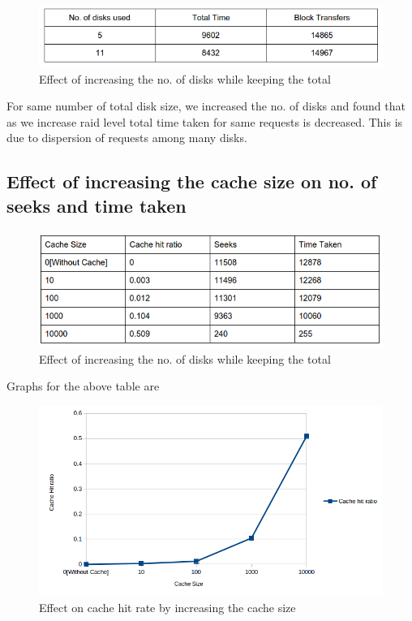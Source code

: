 \documentclass[11pt]{article}
\begin{document}
\begin{figure}[ht!]
\center
\includegraphics[scale = 0.60]{images/table3.png}
\caption{Effect of increasing the no. of disks while keeping the total }
\label{overflow}
\end{figure}


For same number of total disk size, we increased the no. of disks and found that as we increase raid level total time taken for same requests is decreased. This is due to dispersion of requests among many disks.

\subsection{Effect of increasing the cache size on no. of seeks and time taken}
\paragraph{}

\begin{figure}[ht!]
\center
\includegraphics[scale = 0.60]{images/table4.png}
\caption{Effect of increasing the no. of disks while keeping the total }
\label{overflow}
\end{figure}


Graphs for the above table are


\begin{figure}[ht!]
\center
\includegraphics[scale = 0.70]{images/cache.png}
\caption{Effect on cache hit rate by increasing the cache size }
\label{overflow}
\end{figure}
\end{document}
